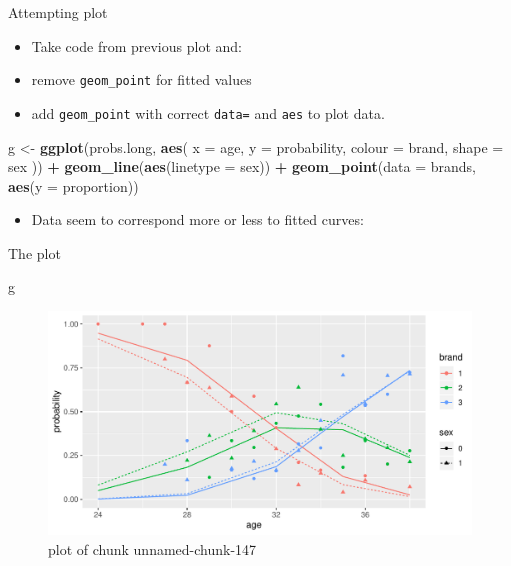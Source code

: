 \documentclass[ignorenonframetext,]{beamer}
\newenvironment{Shaded}{\begin{snugshade}}{\end{snugshade}}
\newcommand{\DataTypeTok}[1]{\textcolor[rgb]{0.13,0.29,0.53}{#1}}
\newcommand{\KeywordTok}[1]{\textcolor[rgb]{0.13,0.29,0.53}{\textbf{#1}}}
\newcommand{\NormalTok}[1]{#1}
\newcommand{\OperatorTok}[1]{\textcolor[rgb]{0.81,0.36,0.00}{\textbf{#1}}}
\newcommand{\StringTok}[1]{\textcolor[rgb]{0.31,0.60,0.02}{#1}}
\providecommand{\tightlist}{%
  \setlength{\itemsep}{0pt}\setlength{\parskip}{0pt}}
\begin{document}
\begin{frame}[fragile]{Attempting plot}
\protect\hypertarget{attempting-plot}{}

\begin{itemize}
\item
  Take code from previous plot and:
\item
  remove \texttt{geom\_point} for fitted values
\item
  add \texttt{geom\_point} with correct \texttt{data=} and \texttt{aes}
  to plot data.
\end{itemize}

\begin{Shaded}
\begin{Highlighting}[]
\NormalTok{g <-}\StringTok{ }\KeywordTok{ggplot}\NormalTok{(probs.long, }\KeywordTok{aes}\NormalTok{(}
  \DataTypeTok{x =}\NormalTok{ age, }\DataTypeTok{y =}\NormalTok{ probability,}
  \DataTypeTok{colour =}\NormalTok{ brand, }\DataTypeTok{shape =}\NormalTok{ sex}
\NormalTok{)) }\OperatorTok{+}
\StringTok{  }\KeywordTok{geom_line}\NormalTok{(}\KeywordTok{aes}\NormalTok{(}\DataTypeTok{linetype =}\NormalTok{ sex)) }\OperatorTok{+}
\StringTok{  }\KeywordTok{geom_point}\NormalTok{(}\DataTypeTok{data =}\NormalTok{ brands, }\KeywordTok{aes}\NormalTok{(}\DataTypeTok{y =}\NormalTok{ proportion))}
\end{Highlighting}
\end{Shaded}

\begin{itemize}
\tightlist
\item
  Data seem to correspond more or less to fitted curves:
\end{itemize}

\end{frame}

\begin{frame}[fragile]{The plot}
\protect\hypertarget{the-plot-2}{}

\begin{Shaded}
\begin{Highlighting}[]
\NormalTok{g}
\end{Highlighting}
\end{Shaded}

\begin{figure}
\centering
\includegraphics{figure/unnamed-chunk-147-1.pdf}
\caption{plot of chunk unnamed-chunk-147}
\end{figure}

\end{frame}
\end{document}
